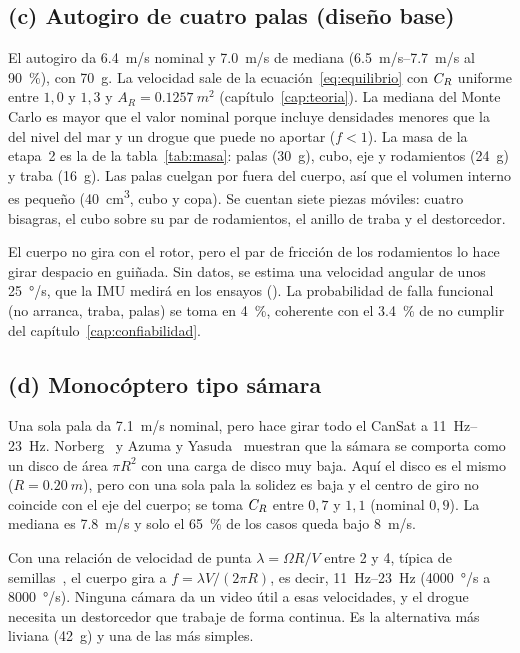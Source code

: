 \subsection{(c) Autogiro de cuatro palas (diseño base)}\label{sec:decision-rot}
El autogiro da \SI{6.4}{m/s} nominal y \SI{7.0}{m/s} de mediana (\SIrange{6.5}{7.7}{m/s}
al \SI{90}{\percent}), con \SI{70}{g}. La velocidad sale de la
ecuación~\eqref{eq:equilibrio} con $C_{R}$ uniforme entre $1{,}0$ y $1{,}3$ y
$A_R=\SI{0.1257}{m^2}$ (capítulo~\ref{cap:teoria}). La mediana del Monte Carlo es mayor
que el valor nominal porque incluye densidades menores que la del nivel del mar y un
drogue que puede no aportar ($f<1$). La masa de la etapa~2 es la de la
tabla~\ref{tab:masa}: palas (\SI{30}{g}), cubo, eje y rodamientos (\SI{24}{g}) y traba
(\SI{16}{g}). Las palas cuelgan por fuera del cuerpo, así que el volumen interno es
pequeño (\SI{40}{cm^3}, cubo y copa). Se cuentan siete piezas móviles: cuatro bisagras, el
cubo sobre su par de rodamientos, el anillo de traba y el destorcedor.

El cuerpo no gira con el rotor, pero el par de fricción de los rodamientos lo hace girar
despacio en guiñada. Sin datos, se estima una velocidad angular de unos
\SI{25}{\degree/s}, que la IMU medirá en los ensayos (). La probabilidad de falla
funcional (no arranca, traba, palas) se toma en \SI{4}{\percent}, coherente con el
\SI{3.4}{\percent} de no cumplir  del capítulo~\ref{cap:confiabilidad}.

\subsection{(d) Monocóptero tipo sámara}\label{sec:decision-mono}
Una sola pala da \SI{7.1}{m/s} nominal, pero hace girar todo el CanSat a
\SIrange{11}{23}{Hz}. Norberg~\cite{norberg1973} y Azuma y Yasuda~\cite{azuma1989}
muestran que la sámara se comporta como un disco de área $\pi R^2$ con una carga de disco
muy baja. Aquí el disco es el mismo ($R=\SI{0.20}{m}$), pero con una sola pala la solidez
es baja y el centro de giro no coincide con el eje del cuerpo; se toma $C_{R}$ entre
$0{,}7$ y $1{,}1$ (nominal $0{,}9$). La mediana es \SI{7.8}{m/s} y solo el
\SI{65}{\percent} de los casos queda bajo \SI{8}{m/s}.

Con una relación de velocidad de punta $\lambda=\Omega R/V$ entre 2 y 4, típica de
semillas~\cite{azuma1989}, el cuerpo gira a $f=\lambda V/(2\pi R)$, es decir, \SIrange{11}{23}{Hz}
(\SI{4000}{\degree/s} a \SI{8000}{\degree/s}). Ninguna cámara da un video útil a esas
velocidades, y el drogue necesita un destorcedor que trabaje de forma continua. Es la
alternativa más liviana (\SI{42}{g}) y una de las más simples.

